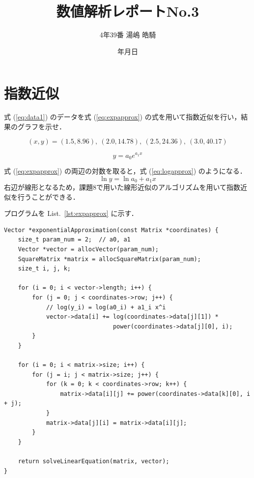 \documentclass[gutter=20mm,fore-edge=20mm,head_space=30mm,foot_space=30mm]{jlreq}
\title{数値解析レポートNo.3}
\author{4年39番 湯嶋 皓騎}
\date{\number\year{}年\number\month{}月\number\day{}日}
\begin{document}
\newcommand*{\mathun}[1]{{\,\mathrm{[#1]}}}
\newcommand*{\textun}[1]{$\mathun{#1}$}
\renewcommand{\figurename}{Fig. }
\renewcommand{\refname}{参考文献}
\maketitle

\section{指数近似}
式 (\ref{eq:data1}) のデータを式 (\ref{eq:expapprox}) の式を用いて指数近似を行い，結果のグラフを示せ．

\begin{equation}
  (x, y) = (1.5, 8.96),\ (2.0, 14.78),\ (2.5, 24.36),\ (3.0, 40.17) \label{eq:data1}
\end{equation}

\begin{equation}
  y = a_0 e^{a_1 x} \label{eq:expapprox}
\end{equation}

式 (\ref{eq:expapprox}) の両辺の対数を取ると，式 (\ref{eq:logapprox}) のようになる．
\begin{equation}
  \ln y = \ln a_0 + a_1 x \label{eq:logapprox}
\end{equation}
右辺が線形となるため，課題8で用いた線形近似のアルゴリズムを用いて指数近似を行うことができる．

プログラムを List.~\ref{lst:expapprox} に示す．

\begin{lstlisting}[caption=指数近似,label=lst:expapprox]
  Vector *exponentialApproximation(const Matrix *coordinates) {
    size_t param_num = 2;  // a0, a1
    Vector *vector = allocVector(param_num);
    SquareMatrix *matrix = allocSquareMatrix(param_num);
    size_t i, j, k;

    for (i = 0; i < vector->length; i++) {
        for (j = 0; j < coordinates->row; j++) {
            // log(y_i) = log(a0_i) + a1_i x^i
            vector->data[i] += log(coordinates->data[j][1]) *
                               power(coordinates->data[j][0], i);
        }
    }

    for (i = 0; i < matrix->size; i++) {
        for (j = i; j < matrix->size; j++) {
            for (k = 0; k < coordinates->row; k++) {
                matrix->data[i][j] += power(coordinates->data[k][0], i + j);
            }
            matrix->data[j][i] = matrix->data[i][j];
        }
    }

    return solveLinearEquation(matrix, vector);
}  
\end{lstlisting}
\end{document}
